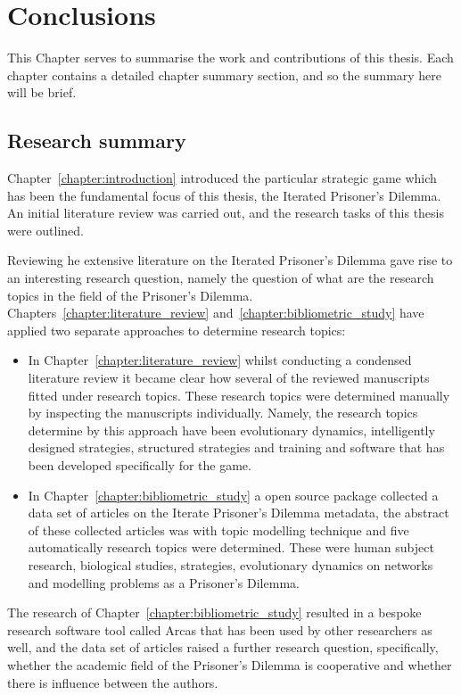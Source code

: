 \chapter{Conclusions}\label{chapter:conclusion}

This Chapter serves to summarise the work and contributions of this thesis. Each
chapter contains a detailed chapter summary section, and so the summary here will be
brief.

\section{Research summary}

Chapter~\ref{chapter:introduction} introduced the particular strategic game
which has been the fundamental focus of this thesis, the Iterated Prisoner's
Dilemma. An initial literature review was carried out, and the
research tasks of this thesis were outlined.

Reviewing he extensive literature on the Iterated Prisoner's Dilemma gave rise
to an interesting research question, namely the question of what are the
research topics in the field of the Prisoner's Dilemma.
Chapters~\ref{chapter:literature_review} and~\ref{chapter:bibliometric_study}
have  applied two separate approaches to determine research topics:

\begin{itemize}
    \item In Chapter~\ref{chapter:literature_review} whilst conducting a
    condensed literature review it became clear how several of the reviewed
    manuscripts fitted under research topics. These research topics were
    determined manually by inspecting the manuscripts individually. Namely, the
    research topics determine by this approach have been evolutionary dynamics,
    intelligently designed strategies, structured strategies and training and
    software that has been developed specifically for the game.
    \item In Chapter~\ref{chapter:bibliometric_study} a open source package
    collected a data set of articles on the Iterate Prisoner's Dilemma metadata,
    the abstract of these collected articles was with topic modelling technique
    and five automatically research topics were determined. These were human
    subject research, biological studies, strategies, evolutionary dynamics on
    networks and modelling problems as a Prisoner's Dilemma.
\end{itemize}

The research of Chapter~\ref{chapter:bibliometric_study} resulted in a bespoke
research software tool called Arcas that has been used by other researchers as
well, and the data set of articles raised a further research question,
specifically, whether the academic field of the Prisoner's Dilemma is
cooperative and whether there is influence between the authors.

